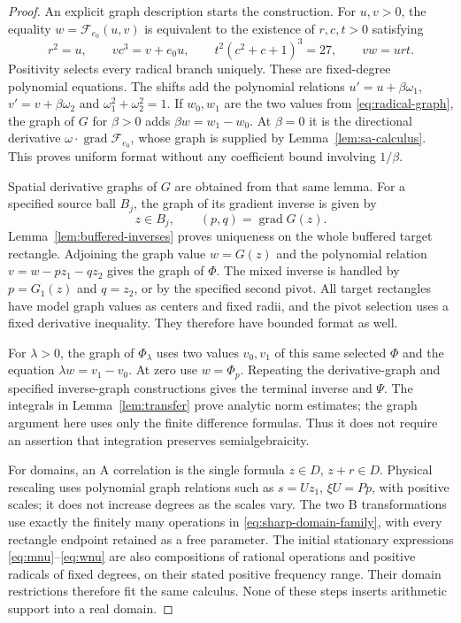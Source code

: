 \documentclass[11pt,a4paper]{article}
\numberwithin{equation}{section}
\theoremstyle{remark}
\DeclareMathOperator{\grad}{grad}
\begin{document}
\begin{proof}
An explicit graph description starts the construction. For $u,v>0$,
the equality $w=\mathcal F_{e_0}(u,v)$ is equivalent to the existence
of $r,c,t>0$ satisfying
\begin{equation}\label{eq:radical-graph}
 r^2=u,\qquad vc^3=v+e_0u,\qquad
 t^2(c^2+c+1)^3=27,\qquad vw=urt.
\end{equation}
Positivity selects every radical branch uniquely. These are fixed-degree
polynomial equations. The shifts add the polynomial relations
$u'=u+\beta\omega_1$, $v'=v+\beta\omega_2$ and
$\omega_1^2+\omega_2^2=1$. If $w_0,w_1$ are the two values from
\eqref{eq:radical-graph}, the graph of $G$ for $\beta>0$ adds
$\beta w=w_1-w_0$. At $\beta=0$ it is the directional derivative
$\omega\cdot\grad\mathcal F_{e_0}$, whose graph is supplied by
Lemma~\ref{lem:sa-calculus}. This proves uniform format without any
coefficient bound involving $1/\beta$.

Spatial derivative graphs of $G$ are obtained from that same lemma.
For a specified source ball $B_j$, the graph of its gradient inverse
is given by
\[
 z\in B_j,\qquad (p,q)=\grad G(z).
\]
Lemma~\ref{lem:buffered-inverses} proves uniqueness on the whole
buffered target rectangle. Adjoining the graph value $w=G(z)$ and the
polynomial relation $v=w-pz_1-qz_2$ gives the graph of $\Phi$.
The mixed inverse is handled by $p=G_1(z)$ and $q=z_2$, or by the
specified second pivot. All target rectangles have model graph values
as centers and fixed radii, and the pivot selection uses a fixed
derivative inequality. They therefore have bounded format as well.

For $\lambda>0$, the graph of $\Phi_\lambda$ uses two values $v_0,v_1$
of this same selected $\Phi$ and the equation $\lambda w=v_1-v_0$.
At zero use $w=\Phi_p$. Repeating the derivative-graph and specified
inverse-graph constructions gives the terminal inverse and $\Psi$.
The integrals in Lemma~\ref{lem:transfer} prove analytic norm estimates;
the graph argument here uses only the finite difference formulas.
Thus it does not require an assertion that integration preserves
semialgebraicity.

For domains, an A correlation is the single formula
$z\in D$, $z+r\in D$. Physical rescaling uses polynomial graph
relations such as $s=Uz_1$, $\xi U=Pp$, with positive scales; it does
not increase degrees as the scales vary. The two B transformations
use exactly the finitely many operations in
\eqref{eq:sharp-domain-family}, with every rectangle endpoint retained
as a free parameter. The initial stationary expressions
\eqref{eq:mnu}--\eqref{eq:wnu} are also compositions of rational
operations and positive radicals of fixed degrees, on their stated
positive frequency range. Their domain restrictions therefore fit the
same calculus. None of these steps inserts arithmetic support into a
real domain.


\end{proof}
\end{document}
